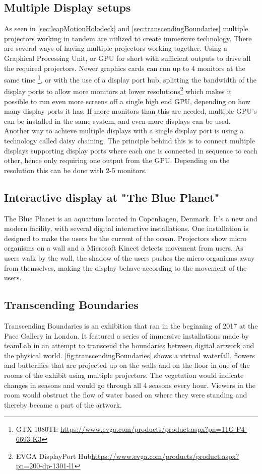 \subsection{Multiple Display setups}
As seen in \autoref{sec:leapMotionHolodeck} and \autoref{sec:transcendingBoundaries} multiple projectors working in tandem are utilized to create immersive technology. There are several ways of having multiple projectors working together. Using a Graphical Processing Unit, or GPU for short with sufficient outputs to drive all the required projectors. Newer graphics cards can run up to 4 monitors at the same time \footnote{GTX 1080TI: \url{https://www.evga.com/products/product.aspx?pn=11G-P4-6693-K3}}, or with the use of a display port hub, splitting the bandwidth of the display ports to allow more monitors at lower resolutions\footnote{EVGA DisplayPort Hub\url{https://www.evga.com/products/product.aspx?pn=200-dp-1301-l1}} which makes it possible to run even more screens off a single high end GPU, depending on how many display ports it has. If more monitors than this are needed, multiple GPU's can be installed in the same system, and even more displays can be used. Another way to achieve multiple displays with a single display port is using a technology called daisy chaining. The principle behind this is to connect multiple displays supporting display ports where each one is connected in sequence to each other, hence only requiring one output from the GPU. Depending on the resolution this can be done with 2-5 monitors\cite{displayport}.

\subsection{Interactive display at "The Blue Planet"}
The Blue Planet is an aquarium located in Copenhagen, Denmark. It's a new and modern facility, with several digital interactive installations. One installation is designed to make the users be the current of the ocean. Projectors show micro organisms on a wall and a Microsoft Kinect detects movement from users. As users walk by the wall, the shadow of the users pushes the micro organisms away from themselves, making the display behave according to the movement of the users.\cite{DenBlaPlanet} 

\subsection{Transcending Boundaries}\label{sec:transcendingBoundaries} %
Transcending Boundaries is an exhibition that ran in the beginning of 2017 at the Pace Gallery in London. It featured a series of immersive installations made by teamLab in an attempt to transcend the boundaries between digital artwork and the physical world\cite{transcendingBoundries}. \autoref{fig:transcendingBoundaries} shows a virtual waterfall, flowers and butterflies that are projected up on the walls and on the floor in one of the rooms of the exhibit using multiple projectors. The vegetation would indicate changes in seasons and would go through all 4 seasons every hour. Viewers in the room would obstruct the flow of water based on where they were standing and thereby became a part of the artwork. 

